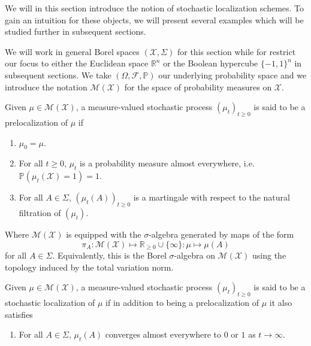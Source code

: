 We will in this section introduce the notion of stochastic localization schemes. 
To gain an intuition for these objects, we will present several examples which 
will be studied further in subsequent sections. 

We will work in general Borel spaces \((\mathcal{X}, \Sigma)\) for this section while for restrict our 
focus to either the Euclidean space \(\mathbb{R}^n\) or the Boolean hypercube \(\{-1, 1\}^n\) 
in subsequent sections. We take \((\Omega, \mathscr{F}, \mathbb{P})\) our underlying probability space 
and we introduce the notation \(\mathcal{M}(\mathcal{X})\) for the space of probability measures on 
\(\mathcal{X}\).

\begin{definition}
  Given \(\mu \in \mathcal{M}(\mathcal{X})\), a measure-valued stochastic process 
  \((\mu_t)_{t \ge 0}\) is said to be a prelocalization of \(\mu\) if 
  \begin{enumerate}[label=(L\arabic*), start=0]
    \item \label{L0} \(\mu_0 = \mu\).
    \item \label{L1} For all \(t \ge 0\), \(\mu_t\) is a probability measure almost everywhere, i.e. 
      \(\mathbb{P}(\mu_t(\mathcal{X}) = 1) = 1\).
    \item \label{L2} For all \(A \in \Sigma\), \((\mu_t(A))_{t \ge 0}\) is a martingale with respect 
      to the natural filtration of \((\mu_t)\).
  \end{enumerate}
  Where \(\mathcal{M}(\mathcal{X})\) is equipped with the \(\sigma\)-algebra generated by maps of the form 
  \[\pi_A : \mathcal{M}(\mathcal{X}) \mapsto \mathbb{R}_{\ge 0} \cup \{\infty\} : \mu \mapsto \mu(A)\] 
  for all \(A \in \Sigma\). Equivalently, this is the Borel \(\sigma\)-algebra on \(\mathcal{M}(\mathcal{X})\) 
  using the topology induced by the total variation norm.
\end{definition}

\begin{definition}
  Given \(\mu \in \mathcal{M}(\mathcal{X})\), a measure-valued stochastic process 
  \((\mu_t)_{t \ge 0}\) is said to be a stochastic localization of \(\mu\) if in addition to being 
  a prelocalization of \(\mu\) it also satisfies
  \begin{enumerate}[label=(L\arabic*), start=3]
    \item \label{L3} For all \(A \in \Sigma\), \(\mu_t(A)\) converges almost everywhere to \(0\) 
      or \(1\) as \(t \to \infty\).
  \end{enumerate}
\end{definition}

